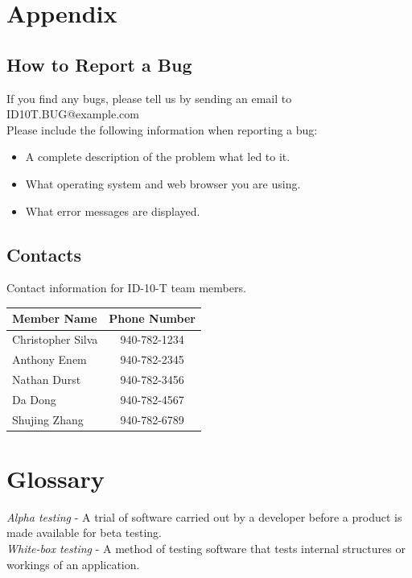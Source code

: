\documentclass{scrreprt}
\begin{document}
	{\let\clearpage\relax \chapter{Appendix}}
	
	\section{How to Report a Bug}
	If you find any bugs, please tell us by sending an email to ID10T.BUG@example.com\\
	Please include the following information when reporting a bug:\\
	\begin{itemize}
		\item A complete description of the problem what led to it.
		\item What operating system and web browser you are using.
		\item What error messages are displayed.
	\end{itemize}
	
	\section{Contacts}
		Contact information for ID-10-T team members.\\
		\begin{tabular}{|l|c|}
			\hline
			Member Name       & Phone Number \\ \hline
			Christopher Silva & 940-782-1234 \\ \hline
			Anthony Enem      & 940-782-2345 \\ \hline
			Nathan Durst      & 940-782-3456 \\ \hline
			Da Dong           & 940-782-4567 \\ \hline
			Shujing Zhang     & 940-782-6789 \\ \hline
		\end{tabular}
	
	{\let\clearpage\relax \chapter{Glossary}}
	\textit{Alpha testing} - A trial of software carried out by a developer before a product is made available for beta testing.\\
	
	\textit{White-box testing} - A method of testing software that tests internal structures or workings of an application. 
\end{document}
